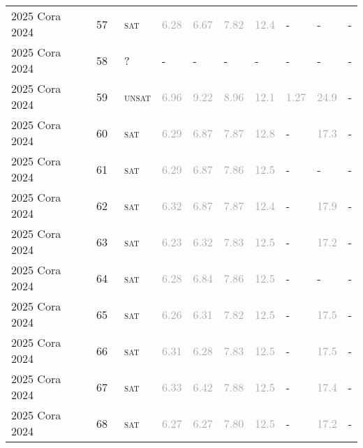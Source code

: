 \begin{center}
{\begin{longtable}{@{}llllllllll@{}}
2025 Cora 2024 & 57 & ~\textsc{sat} & \textcolor{darkgray}{6.28} & \textcolor{darkgray}{6.67} & \textcolor{darkgray}{7.82} & \textcolor{darkgray}{12.4} & - & - & - \\
2025 Cora 2024 & 58 & ~? & - & - & - & - & - & - & - \\
2025 Cora 2024 & 59 & ~\textsc{unsat} & \textcolor{darkgray}{6.96} & \textcolor{darkgray}{9.22} & \textcolor{darkgray}{8.96} & \textcolor{darkgray}{12.1} & \textcolor{darkgray}{1.27} & \textcolor{darkgray}{24.9} & - \\
2025 Cora 2024 & 60 & ~\textsc{sat} & \textcolor{darkgray}{6.29} & \textcolor{darkgray}{6.87} & \textcolor{darkgray}{7.87} & \textcolor{darkgray}{12.8} & - & \textcolor{darkgray}{17.3} & - \\
2025 Cora 2024 & 61 & ~\textsc{sat} & \textcolor{darkgray}{6.29} & \textcolor{darkgray}{6.87} & \textcolor{darkgray}{7.86} & \textcolor{darkgray}{12.5} & - & - & - \\
2025 Cora 2024 & 62 & ~\textsc{sat} & \textcolor{darkgray}{6.32} & \textcolor{darkgray}{6.87} & \textcolor{darkgray}{7.87} & \textcolor{darkgray}{12.4} & - & \textcolor{darkgray}{17.9} & - \\
2025 Cora 2024 & 63 & ~\textsc{sat} & \textcolor{darkgray}{6.23} & \textcolor{darkgray}{6.32} & \textcolor{darkgray}{7.83} & \textcolor{darkgray}{12.5} & - & \textcolor{darkgray}{17.2} & - \\
2025 Cora 2024 & 64 & ~\textsc{sat} & \textcolor{darkgray}{6.28} & \textcolor{darkgray}{6.84} & \textcolor{darkgray}{7.86} & \textcolor{darkgray}{12.5} & - & - & - \\
2025 Cora 2024 & 65 & ~\textsc{sat} & \textcolor{darkgray}{6.26} & \textcolor{darkgray}{6.31} & \textcolor{darkgray}{7.82} & \textcolor{darkgray}{12.5} & - & \textcolor{darkgray}{17.5} & - \\
2025 Cora 2024 & 66 & ~\textsc{sat} & \textcolor{darkgray}{6.31} & \textcolor{darkgray}{6.28} & \textcolor{darkgray}{7.83} & \textcolor{darkgray}{12.5} & - & \textcolor{darkgray}{17.5} & - \\
2025 Cora 2024 & 67 & ~\textsc{sat} & \textcolor{darkgray}{6.33} & \textcolor{darkgray}{6.42} & \textcolor{darkgray}{7.88} & \textcolor{darkgray}{12.5} & - & \textcolor{darkgray}{17.4} & - \\
2025 Cora 2024 & 68 & ~\textsc{sat} & \textcolor{darkgray}{6.27} & \textcolor{darkgray}{6.27} & \textcolor{darkgray}{7.80} & \textcolor{darkgray}{12.5} & - & \textcolor{darkgray}{17.2} & - \\

\end{longtable}}
\end{center}
